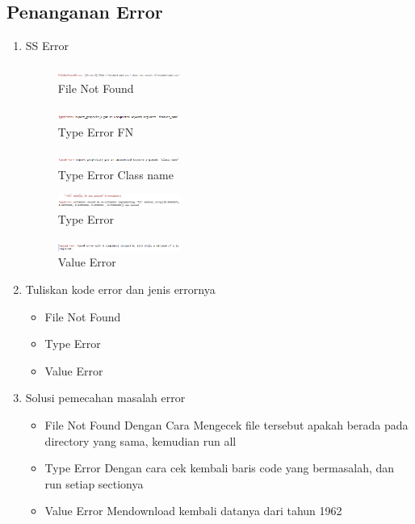 \subsection{Penanganan Error}
\begin{enumerate}
	\item SS Error
	\hfill\break
	\begin{figure}[H]
		\includegraphics[width=4cm]{figures/1174031/2/error/2_file_not_found.png}
		\centering
		\caption{File Not Found}
	\end{figure}
	\begin{figure}[H]
		\includegraphics[width=4cm]{figures/1174031/2/error/2_type.png}
		\centering
		\caption{Type Error FN}
	\end{figure}
	\begin{figure}[H]
		\includegraphics[width=4cm]{figures/1174031/2/error/2_type2.png}
		\centering
		\caption{Type Error Class name}
	\end{figure}
	\begin{figure}[H]
		\includegraphics[width=4cm]{figures/1174031/2/error/2_type3.png}
		\centering
		\caption{Type Error}
	\end{figure}
	\begin{figure}[H]
		\includegraphics[width=4cm]{figures/1174031/2/error/2_value.png}
		\centering
		\caption{Value Error}
	\end{figure}
	\item Tuliskan kode error dan jenis errornya
	\hfill\break
	\begin{itemize}
		\item File Not Found
		\item Type Error
		\item Value Error
	\end{itemize}
	\item Solusi pemecahan masalah error
	\hfill\break
	\begin{itemize}
		\item File Not Found
		\hfill\break
		Dengan Cara Mengecek file tersebut apakah berada pada directory yang sama, kemudian run all
		\item Type Error
		\hfill\break
		Dengan cara cek kembali baris code yang bermasalah, dan run setiap sectionya
		\item Value Error
		\hfill\break
		Mendownload kembali datanya dari tahun 1962
	\end{itemize}
\end{enumerate}
